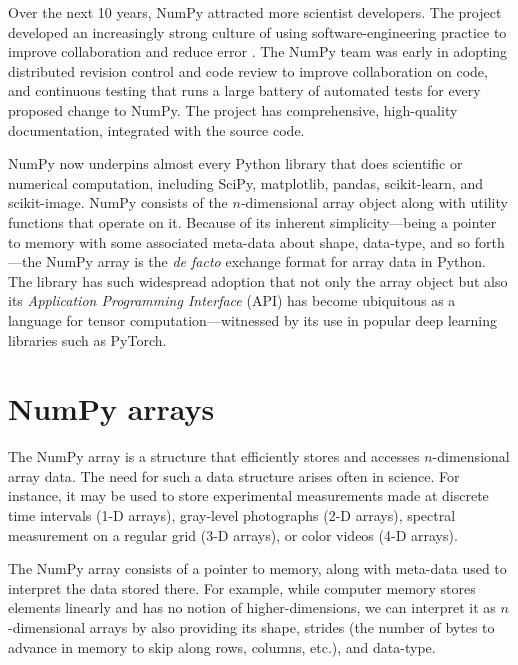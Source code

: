 Over the next 10 years, NumPy attracted more scientist developers.
The project developed an increasingly strong culture of using
software-engineering practice to improve collaboration and reduce error
\cite{millman2014developing}. The NumPy team was early in adopting distributed
revision control and code review to improve collaboration on code, and
continuous testing that runs a large battery of automated tests for every proposed
change to NumPy.
The project has comprehensive, high-quality documentation,
integrated with the source
code\cite{vanderwalt2008scipy,harrington2008scipy,harrington2009scipy}. 

NumPy now underpins almost every Python library that does scientific or
numerical computation, including SciPy\cite{virtanen2019scipy},
matplotlib\cite{hunter2007matplotlib}, pandas\cite{mckinney-proc-scipy-2010},
scikit-learn\cite{pedregosa2011scikit}, and
scikit-image\cite{vanderwalt2014scikit}.
NumPy consists of the $n$-dimensional array object along with utility functions
that operate on it.
Because of its inherent simplicity---being a pointer to memory with some
associated meta-data about shape, data-type, and so forth---the NumPy array is
the {\it de facto} exchange format for array data in Python.
The library has such widespread adoption that not only the array object but also its
{\it Application Programming Interface} (API) has become ubiquitous as
a language for tensor computation---witnessed by its use in popular
deep learning libraries such as PyTorch\cite{pytorch}.




\section*{NumPy arrays}

The NumPy array is a structure that efficiently stores and accesses $n$-dimensional array data\cite{vanderwalt2011numpy}.  The need for such a data structure arises often in science.  For instance, it may be used to store experimental measurements made at discrete time intervals (1-D arrays), gray-level photographs (2-D arrays), spectral measurement on a regular grid (3-D arrays), or color videos (4-D arrays).

The NumPy array consists of a pointer to memory, along with meta-data used to interpret the data stored there.  For example, while computer memory stores elements linearly and has no notion of higher-dimensions, we can interpret it as $n$-dimensional arrays by also providing its shape, strides (the number of bytes to advance in memory to skip along rows, columns, etc.), and data-type.

